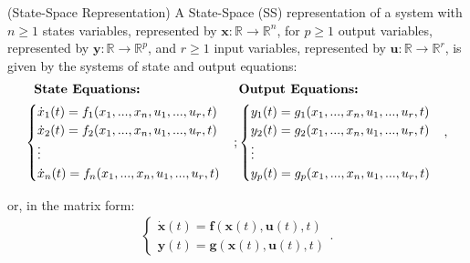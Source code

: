 \documentclass[a4paper,11pt]{book}
\numberwithin{figure}{chapter}
\numberwithin{equation}{chapter}
\numberwithin{table}{chapter}
\theoremstyle{definition}
\newtheorem{definition}{Definition}[chapter]
\newcounter{boxed-theorem}
\newcounter{boxed-definition}
\newenvironment{boxed-definition}[1]
{\colorlet{shadecolor}{pastelYellow!15} \begin{shaded} \begin{definition}{#1}}
{\end{definition} \end{shaded}}
\newcounter{boxed-example}
\begin{document}
\begin{boxed-definition}{(State-Space Representation)} \label{th:SSRepr01}
    A State-Space (SS) representation of a system with $n \geq 1$ states variables, represented by $\bm{x} : \mathbb{R} \rightarrow \mathbb{R}^{n}$, for $p \geq 1$ output variables, represented by $\bm{y} : \mathbb{R} \rightarrow \mathbb{R}^{p}$, and $r \geq 1$ input variables, represented by $\bm{u} : \mathbb{R} \rightarrow \mathbb{R}^{r}$, is given by the systems of state and output equations:
    \begin{align} \label{eq:SSRepr01}
    \begin{split}
    \textbf{State Equations:}\ \ \ \ \ \ \ \ \ \ \ \ \ \ \ \ \ \ \ \ \ \  \hfill & \textbf{ Output Equations:} \hfill \\
    \begin{cases}
        \dot{x}_1(t) = f_1(x_1, ..., x_n, u_1, ..., u_r, t) \\
        \dot{x}_2(t) = f_2(x_1, ..., x_n, u_1, ..., u_r, t) \\
        \vdots \\
        \dot{x}_n(t) = f_n(x_1, ..., x_n, u_1, ..., u_r, t)
    \end{cases} \hfill &;  \begin{cases}
        y_1(t) = g_1(x_1, ..., x_n, u_1, ..., u_r, t) \\
        y_2(t) = g_2(x_1, ..., x_n, u_1, ..., u_r, t) \\
        \vdots \\
        y_p(t) = g_p(x_1, ..., x_n, u_1, ..., u_r, t) \hfill
    \end{cases}
    \end{split}
    ,\end{align}
    
    \noindent or, in the matrix form:
    \begin{align} \label{eq:SSRepr02}
    \begin{cases}
        \dot{\bm{x}}(t) = \bm{f}(\bm{x}(t), \bm{u}(t), t) \\
        \bm{y}(t) = \bm{g}(\bm{x}(t), \bm{u}(t), t)
    \end{cases}
    .\end{align}
\end{boxed-definition}
\end{document}
